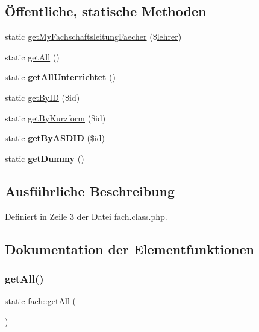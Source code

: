 \subsection*{Öffentliche, statische Methoden}
\begin{DoxyCompactItemize}
\item 
static \mbox{\hyperlink{classfach_afbc97bc7897a0412cf6aafd73b6cdd8a}{get\+My\+Fachschaftsleitung\+Faecher}} (\$\mbox{\hyperlink{classlehrer}{lehrer}})
\item 
static \mbox{\hyperlink{classfach_adc25eea418e76d23892ac83d37702bc7}{get\+All}} ()
\item 
\mbox{\label{classfach_a2c67c7f967728bb75237ac8c41aee7e7}} 
static {\bfseries get\+All\+Unterrichtet} ()
\item 
static \mbox{\hyperlink{classfach_ad5a2b27a57d355a1ed741cdbf3a9d9e3}{get\+By\+ID}} (\$id)
\item 
static \mbox{\hyperlink{classfach_ad38e0bd442e74dbcd992846cd04e4bb5}{get\+By\+Kurzform}} (\$id)
\item 
\mbox{\label{classfach_a68cffb65eb4b1ca61a57f95974ae7009}} 
static {\bfseries get\+By\+A\+S\+D\+ID} (\$id)
\item 
\mbox{\label{classfach_ae8f8fc6ee73da47bcef16a36cb0c87ca}} 
static {\bfseries get\+Dummy} ()
\end{DoxyCompactItemize}


\subsection{Ausführliche Beschreibung}


Definiert in Zeile 3 der Datei fach.\+class.\+php.



\subsection{Dokumentation der Elementfunktionen}
\mbox{\label{classfach_adc25eea418e76d23892ac83d37702bc7}} 
\subsubsection{\texorpdfstring{get\+All()}{getAll()}}
{\footnotesize\ttfamily static fach\+::get\+All (\begin{DoxyParamCaption}{ }\end{DoxyParamCaption})\hspace{0.3cm}{\ttfamily [static]}}

